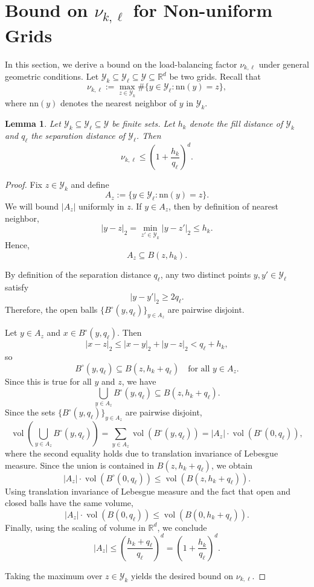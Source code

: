 \documentclass[11pt]{article}
\theoremstyle{plain}
\newtheorem{lemma}{Lemma}
\newcommand{\Ycal}{\mathcal{Y}}
\begin{document}
\section{Bound on $\nu_{k,\ell}$ for Non-uniform Grids}
\label{appdx:nonuniform}

In this section, we derive a bound on the load-balancing factor $\nu_{k,\ell}$ under general geometric conditions. Let $\Ycal_k \subseteq \Ycal_\ell \subseteq \Ycal \subseteq \mathbb{R}^d$ be two grids. Recall that
\[
\nu_{k,\ell}
:=
\max_{z \in \Ycal_k}
\#\{y \in \Ycal_\ell : \mathrm{nn}(y)=z\},
\]
where $\mathrm{nn}(y)$ denotes the nearest neighbor of $y$ in $\Ycal_k$.

\begin{lemma}
Let $\Ycal_k \subseteq \Ycal_\ell \subseteq \Ycal$ be finite sets. Let $h_k$ denote the fill distance of $\Ycal_k$ and $q_\ell$ the separation distance of $\Ycal_\ell$. Then
\[
\nu_{k,\ell}
\le
\left(1+\frac{h_k}{q_\ell}\right)^d.
\]
\end{lemma}

\begin{proof}
Fix $z \in \Ycal_k$ and define
\[
A_z := \{y \in \Ycal_\ell : \mathrm{nn}(y)=z\}.
\]
We will bound $|A_z|$ uniformly in $z$. If $y \in A_z$, then by definition of nearest neighbor,
\[
|y - z|_2 = \min_{z' \in \Ycal_k} |y - z'|_2 \le h_k.
\]
Hence,
\[
A_z \subseteq B(z,h_k).
\]

By definition of the separation distance $q_\ell$, any two distinct points $y,y' \in \Ycal_\ell$ satisfy
\[
|y - y'|_2 \ge 2q_\ell.
\]
Therefore, the open balls $\{B^\circ(y,q_\ell)\}_{y \in A_z}$ are pairwise disjoint.

Let $y \in A_z$ and $x \in B^\circ(y,q_\ell)$. Then
\[
|x - z|_2 \le |x - y|_2 + |y - z|_2 < q_\ell + h_k,
\]
so
\[
B^\circ(y,q_\ell) \subseteq B(z,h_k + q_\ell)
\quad \text{for all } y \in A_z.
\]
Since this is true for all $y$ and $z$, we have
\[
\bigcup_{y \in A_z} B^\circ(y,q_\ell) \subseteq B(z,h_k + q_\ell).
\]
Since the sets $\{B^\circ(y,q_\ell)\}_{y \in A_z}$ are pairwise disjoint,
\[
\operatorname{vol}\!\left(\bigcup_{y \in A_z} B^\circ(y,q_\ell)\right)
=
\sum_{y \in A_z} \operatorname{vol}(B^\circ(y,q_\ell))
=
|A_z| \cdot \operatorname{vol}(B^\circ(0,q_\ell)),
\]
where the second equality holds due to translation invariance of Lebesgue measure.
Since the union is contained in $B(z,h_k + q_\ell)$, we obtain
\[
|A_z| \cdot \operatorname{vol}(B^\circ(0,q_\ell))
\le
\operatorname{vol}(B(z,h_k + q_\ell)).
\]
Using translation invariance of Lebesgue measure and the fact that open and closed balls have the same volume,
\[
|A_z| \cdot \operatorname{vol}(B(0,q_\ell))
\le
\operatorname{vol}(B(0,h_k + q_\ell)).
\]
Finally, using the scaling of volume in $\mathbb{R}^d$, we conclude
\[
|A_z|
\le
\left(\frac{h_k + q_\ell}{q_\ell}\right)^d
=
\left(1+\frac{h_k}{q_\ell}\right)^d.
\]

Taking the maximum over $z \in \Ycal_k$ yields the desired bound on $\nu_{k,\ell}$.
\end{proof}
\end{document}
